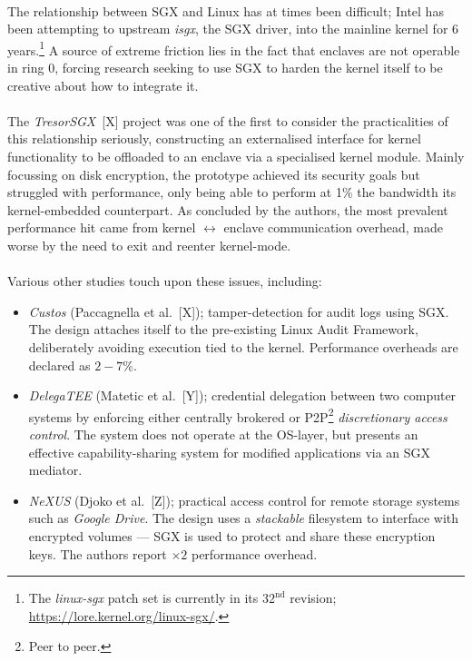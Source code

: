 \paragraph{} The relationship between SGX and Linux has at times been difficult; Intel has been attempting to upstream \textit{isgx}, the SGX driver, into the mainline kernel for 6 years.\footnote{The \textit{linux-sgx} patch set is currently in its $32^{\text{nd}}$ revision; \url{https://lore.kernel.org/linux-sgx/}.} A source of extreme friction lies in the fact that enclaves are not operable in ring 0, forcing research seeking to use SGX to harden the kernel itself to be creative about how to integrate it.

\paragraph{} The \textit{TresorSGX}~[X] project was one of the first to consider the practicalities of this relationship seriously, constructing an externalised interface for kernel functionality to be offloaded to an enclave via a specialised kernel module. Mainly focussing on disk encryption, the prototype achieved its security goals but struggled with performance, only being able to perform at 1\% the bandwidth its kernel-embedded counterpart. As concluded by the authors, the most prevalent performance hit came from kernel $\leftrightarrow$ enclave communication overhead, made worse by the need to exit and reenter kernel-mode.


\paragraph{} Various other studies touch upon these issues, including:

\begin{itemize}
    \item \textit{Custos} (Paccagnella et al.~[X]); tamper-detection for audit logs using SGX. The design attaches itself to the pre-existing Linux Audit Framework, deliberately avoiding execution tied to the kernel. Performance overheads are declared as $2-7$\%. 
    \item \textit{DelegaTEE} (Matetic et al.~[Y]); credential delegation between two computer systems by enforcing either centrally brokered or P2P\footnote{Peer to peer.} \textit{discretionary access control}. The system does not operate at the OS-layer, but presents an effective capability-sharing system for modified applications via an SGX mediator.
    \item \textit{NeXUS} (Djoko et al.~[Z]); practical access control for remote storage systems such as \textit{Google Drive}. The design uses a \textit{stackable} filesystem to interface with encrypted volumes --- SGX is used to protect and share these encryption keys. The authors report $\times 2$ performance overhead.
\end{itemize}


